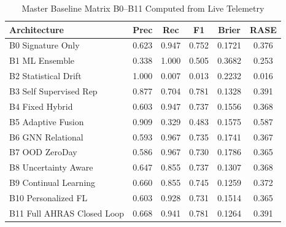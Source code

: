 \begin{table}[t]
\centering
\small
\caption{Master Baseline Matrix B0--B11 Computed from Live Telemetry}
\label{tab:baselines}
\begin{tabular}{lccccc}
\toprule
\textbf{Architecture} & \textbf{Prec} & \textbf{Rec} & \textbf{F1} & \textbf{Brier} & \textbf{RASE} \\
\midrule
B0 Signature Only & 0.623 & 0.947 & 0.752 & 0.1721 & 0.376 \\
B1 ML Ensemble & 0.338 & 1.000 & 0.505 & 0.3682 & 0.253 \\
B2 Statistical Drift & 1.000 & 0.007 & 0.013 & 0.2232 & 0.016 \\
B3 Self Supervised Rep & 0.877 & 0.704 & 0.781 & 0.1328 & 0.391 \\
B4 Fixed Hybrid & 0.603 & 0.947 & 0.737 & 0.1556 & 0.368 \\
B5 Adaptive Fusion & 0.909 & 0.329 & 0.483 & 0.1575 & 0.587 \\
B6 GNN Relational & 0.593 & 0.967 & 0.735 & 0.1741 & 0.367 \\
B7 OOD ZeroDay & 0.586 & 0.967 & 0.730 & 0.1786 & 0.365 \\
B8 Uncertainty Aware & 0.647 & 0.855 & 0.737 & 0.1307 & 0.368 \\
B9 Continual Learning & 0.660 & 0.855 & 0.745 & 0.1259 & 0.372 \\
B10 Personalized FL & 0.603 & 0.928 & 0.731 & 0.1514 & 0.365 \\
B11 Full AHRAS Closed Loop & 0.668 & 0.941 & 0.781 & 0.1264 & 0.391 \\
\bottomrule
\end{tabular}
\end{table}